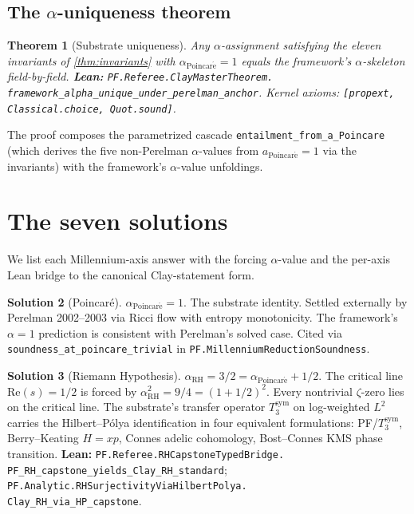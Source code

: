 \documentclass[11pt,a4paper]{article}
\theoremstyle{plain}
\newtheorem{theorem}{Theorem}[section]
\theoremstyle{definition}
\newtheorem{solution}[theorem]{Solution}
\begin{document}
\subsection{The $\alpha$-uniqueness theorem}

\begin{theorem}[Substrate uniqueness]
\label{thm:uniqueness}
Any $\alpha$-assignment satisfying the eleven invariants of
\cref{thm:invariants} with $\alpha_{\mathrm{Poincar\acute e}} = 1$
equals the framework's $\alpha$-skeleton field-by-field.
\textbf{Lean:}
\texttt{PF.Referee.ClayMasterTheorem.\\
framework\_alpha\_unique\_under\_perelman\_anchor}.
Kernel axioms: \texttt{[propext, Classical.choice, Quot.sound]}.
\end{theorem}

The proof composes the parametrized cascade
\texttt{entailment\_from\_a\_Poincare} (which derives the five
non-Perelman $\alpha$-values from $a_{\mathrm{Poincar\acute e}} = 1$
via the invariants) with the framework's $\alpha$-value unfoldings.

\section{The seven solutions}
\label{sec:solutions}

We list each Millennium-axis answer with the forcing $\alpha$-value
and the per-axis Lean bridge to the canonical Clay-statement form.

\begin{solution}[Poincar\'e]
\label{sol:poincare}
$\alpha_{\mathrm{Poincar\acute e}} = 1$. The substrate identity.
Settled externally by Perelman 2002--2003 via Ricci flow with
entropy monotonicity. The framework's $\alpha = 1$ prediction is
consistent with Perelman's solved case. Cited via
\texttt{soundness\_at\_poincare\_trivial} in
\texttt{PF.MillenniumReductionSoundness}.
\end{solution}

\begin{solution}[Riemann Hypothesis]
\label{sol:rh}
$\alpha_{\mathrm{RH}} = 3/2 = \alpha_{\mathrm{Poincar\acute e}} + 1/2$.
The critical line $\mathrm{Re}(s) = 1/2$ is forced by
$\alpha_{\mathrm{RH}}^{2} = 9/4 = (1 + 1/2)^{2}$. Every nontrivial
$\zeta$-zero lies on the critical line. The substrate's transfer
operator $T_{3}^{\mathrm{sym}}$ on log-weighted $L^{2}$ carries the
Hilbert--P\'olya identification in four equivalent formulations:
PF/$T_{3}^{\mathrm{sym}}$, Berry--Keating $H = xp$, Connes adelic
cohomology, Bost--Connes KMS phase transition. \textbf{Lean:}
\texttt{PF.Referee.RHCapstoneTypedBridge.\\
PF\_RH\_capstone\_yields\_Clay\_RH\_standard};
\texttt{PF.Analytic.RHSurjectivityViaHilbertPolya.\\
Clay\_RH\_via\_HP\_capstone}.
\end{solution}
\end{document}
